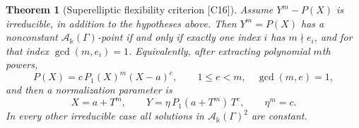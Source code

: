 \documentclass[11pt,oneside]{article}
\numberwithin{equation}{section}
\newtheorem{theorem}{Theorem}[section]
\theoremstyle{definition}
\theoremstyle{remark}
\newcommand{\src}[1]{\textup{\textsf{\small[#1]}}}
\newcommand{\crA}{\mathcal A_\Bbbk(\Gamma)}
\begin{document}
\begin{theorem}[Superelliptic flexibility criterion \src{C16}]\label{odg:sg:thm:super}
Assume $Y^m-P(X)$ is irreducible, in addition to the hypotheses above.
Then $Y^m=P(X)$ has a nonconstant $\crA$-point if and only if exactly one
index $i$ has $m\nmid e_i$, and for that index $\gcd(m,e_i)=1$. Equivalently, after
extracting polynomial $m$th powers,
\begin{equation}\label{odg:sg:eq:exceptional}
 P(X)=c\,P_1(X)^m(X-a)^e,\qquad 1\le e<m,\quad\gcd(m,e)=1,
\end{equation}
and then a normalization parameter is
\begin{equation}\label{odg:sg:eq:superparam}
 X=a+T^m,\qquad Y=\eta\,P_1(a+T^m)\,T^e,\qquad \eta^m=c .
\end{equation}
In every other irreducible case all solutions in $\crA^2$ are constant.
\end{theorem}
\end{document}
